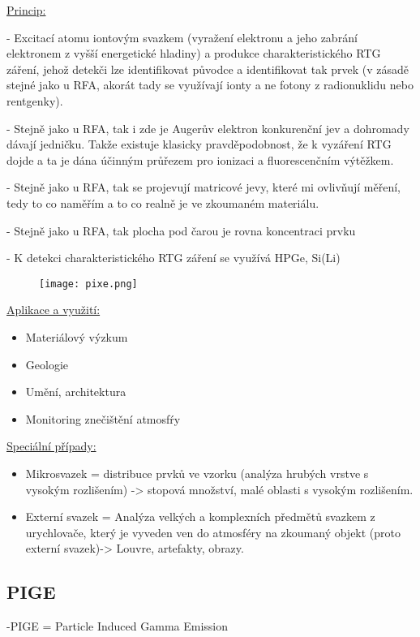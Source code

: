 \underline{Princip:}

- Excitací atomu iontovým svazkem (vyražení elektronu a jeho zabrání elektronem z vyšší energetické hladiny) a produkce charakteristického RTG záření, jehož detekči lze identifikovat původce a identifikovat tak prvek (v zásadě stejné jako u RFA, akorát tady se využívají ionty a ne fotony z radionuklidu nebo rentgenky).

- Stejně jako u RFA, tak i zde je Augerův elektron konkurenční jev a dohromady dávají jedničku. Takže existuje klasicky pravděpodobnost, že k vyzáření RTG dojde a ta je dána účinným průřezem pro ionizaci a fluorescenčním výtěžkem.

- Stejně jako u RFA, tak se projevují matricové jevy, které mi ovlivňují měření, tedy to co naměřím a to co realně je ve zkoumaném materiálu.

- Stejně jako u RFA, tak plocha pod čarou je rovna koncentraci prvku

- K detekci charakteristického RTG záření se využívá HPGe, Si(Li)

\begin{figure}[ht!]
	\texttt{[image: pixe.png]}
\end{figure}

\underline{Aplikace a využití:}
\begin{itemize}
    \item Materiálový výzkum
    \item Geologie
    \item Umění, architektura
    \item Monitoring znečištění atmosfŕy
\end{itemize}

\underline{Speciální případy:}
\begin{itemize}
    \item Mikrosvazek = distribuce prvků ve vzorku (analýza hrubých vrstve s vysokým rozlišením) -> stopová množství, malé oblasti s vysokým rozlišením.
    \item Externí svazek = Analýza velkých a komplexních předmětů svazkem z urychlovače, který je vyveden ven do atmosféry na zkoumaný objekt (proto externí svazek)-> Louvre, artefakty, obrazy.
\end{itemize}


\subsection{PIGE}
-PIGE = Particle Induced Gamma Emission

